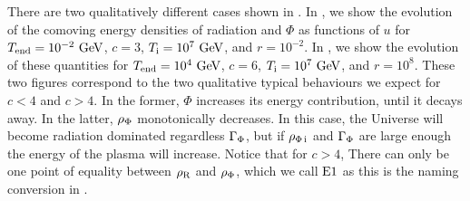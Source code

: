 \documentclass[11pt,a4paper]{article}
\begin{document}
There are two qualitatively different cases shown in . 
%
In , we show the evolution of the comoving energy densities of radiation and $\Phi$ as functions of $u$ for $T_{\rm end}{}=10^{-2}~{\rm GeV}$, $c=3$, $T_{\rm i}{}=10^7~{\rm GeV}$, and $r=10^{-2}$. In , we show the evolution of these quantities for $T_{\rm end}{}=10^{4}~{\rm GeV}$, $c=6$, $T_{\rm i}{}=10^7~{\rm GeV}$, and $r=10^{8}$. 
%
These two figures correspond to the two qualitative typical behaviours we expect for $c<4$ and $c>4$. In the former, $\Phi$ increases its energy contribution, until it decays away. In the latter,  $\rho_{\Phi}$ monotonically decreases. In this case, the Universe will become radiation dominated regardless $\Gamma_{\Phi}$, but if $\rho_{\Phi\,{\rm i}}$ and $\Gamma_{\Phi}$ are large enough the energy of the plasma will increase.  Notice that for $c>4$, There can only be one point of equality between $\rho_{\rm R}$ and $\rho_{\Phi}$, which we call ${\rm E1}{}$ as this is the naming conversion in \nsc.
%
\end{document}
